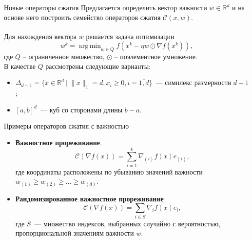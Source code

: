 \documentclass{beamer}
\DeclareMathOperator*{\argmin}{arg\,min}
\begin{document}

\begin{frame}{Новые операторы сжатия}
    Предлагается определить вектор важности $w \in \mathbb{R}^d$ и на основе него построить семейство операторов сжатия $\mathcal{C}(x, w)$.\\
    $ $\\
    Для нахождения вектора $w$ решается задача оптимизации
    \begin{equation}
     w^k = \argmin_{w \in Q} f(x^k - \eta w \odot \nabla f(x^k)),
    \end{equation}
    где $Q$ -- ограниченное множество, $\odot$ -- поэлементное умножение.\\

    В качестве $Q$ рассмотрены следующие варианты:
    \begin{itemize}
        \item $\Delta_{d - 1} = \{x \in \mathbb{R}^d ~|~ \|x\|_1 = d, x_i \geq 0, i = \overline{1, d}\}$~--- симплекс размерности $d - 1$;
        \item $[a, b]^d$~--- куб со сторонами длины $b - a$.
    \end{itemize}
\end{frame}


\begin{frame}{Примеры операторов сжатия с важностью}
    \begin{itemize}
        \item \textbf{Важностное прореживание}.\\
        \begin{equation}
            \mathcal{C}(\nabla f(x)) = \sum_{i=1}^k \nabla_{(i)} f(x) e_{(i)},
        \end{equation}
        где координаты расположены по убыванию значений важности $w_{(1)} \geq w_{(2)} \geq \dots \geq w_{(d)}$.
        \item \textbf{Рандомизированное важностное прореживание}\\
        \begin{equation}
            \mathcal{C}(\nabla f(x)) = \sum_{i \in S} \nabla_i f(x) e_i,
        \end{equation}
        где $S$~--- множество индексов, выбранных случайно с вероятностью, пропорциональной значениям важности $w$.
    \end{itemize}
\end{frame}
\end{document}
